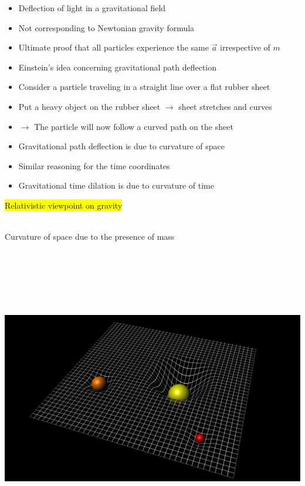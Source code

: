 \onecolumn
\begin{itemize}
\item Deflection of light in a gravitational field
\item[] Not corresponding to Newtonian gravity formula
\item[] Ultimate proof that all particles experience the same $\vec{a}$ irrespective of $m$
\item Einstein's idea concerning gravitational path deflection
\item[] Consider a particle traveling in a straight line over a flat rubber sheet
\item[] Put a heavy object on the rubber sheet $\rightarrow$ sheet stretches and curves
\item[] $\rightarrow$ The particle will now follow a curved path on the sheet
\item[] {\blue Gravitational path deflection is due to curvature of space}
\item Similar reasoning for the time coordinates
\item[] {\blue Gravitational time dilation is due to curvature of time}
\end{itemize}
%
\begin{center}
\colorbox{yellow}{Relativistic viewpoint on gravity}\\[3mm]
{\red {}}\\[3mm]
{\red {}}
\end{center}

\Tr
\begin{center}
{\blue Curvature of space due to the presence of mass}\\[5mm]
\includegraphics[keepaspectratio,height=14cm]{curvature}
\end{center}

